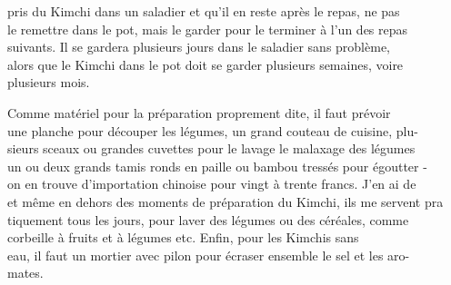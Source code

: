pris du Kimchi dans un saladier et qu'il en reste après le repas, ne pas\\
le remettre dans le pot, mais le garder pour le terminer à l'un des repas\\
suivants. Il se gardera plusieurs jours dans le saladier sans problème,\\
alors que le Kimchi dans le pot doit se garder plusieurs semaines, voire\\
plusieurs mois.

Comme matériel pour la préparation proprement dite, il faut prévoir\\
une planche pour découper les légumes, un grand couteau de cuisine, plu-\\
sieurs sceaux ou grandes cuvettes pour le lavage  le malaxage des légumes\\
un ou deux grands tamis ronds en paille ou bambou tressés pour égoutter -\\
on en trouve d'importation chinoise pour vingt à trente francs. J'en ai de\\
et même en dehors des moments de préparation du Kimchi, ils me servent pra\unsure{-}\\
tiquement tous les jours, pour laver des légumes ou des céréales, comme\\
 corbeille à fruits et à légumes etc. Enfin, pour les Kimchis sans\\
eau, il faut un mortier avec pilon pour écraser ensemble le sel et les aro-\\
mates.

